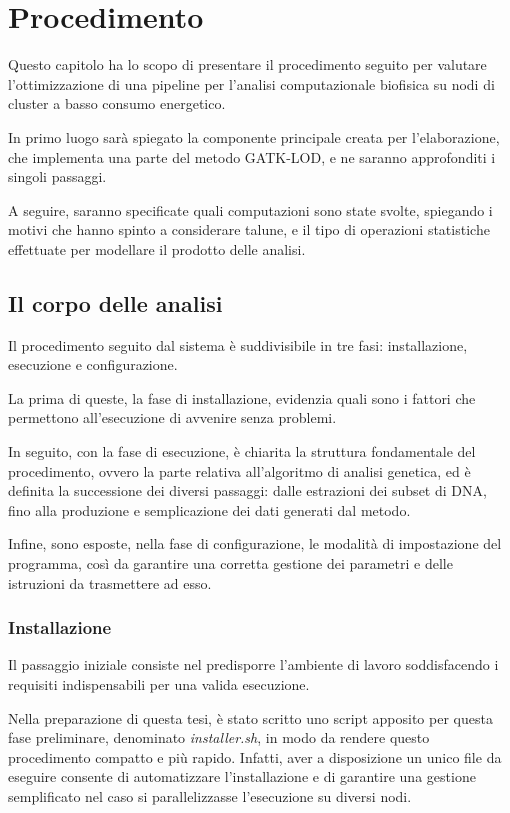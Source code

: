 \chapter{Procedimento}
Questo capitolo ha lo scopo di presentare il procedimento seguito per valutare l'ottimizzazione di una pipeline per l'analisi computazionale biofisica su nodi di cluster a basso consumo energetico.


In primo luogo sarà spiegato la componente principale creata per l'elaborazione, che implementa una parte del metodo GATK-LOD, e ne saranno approfonditi i singoli passaggi.

A seguire, saranno specificate quali computazioni sono state svolte, spiegando i motivi che hanno spinto a considerare talune, e il tipo di operazioni statistiche effettuate per modellare il prodotto delle analisi.



\section{Il corpo delle analisi}
Il procedimento seguito dal sistema è suddivisibile in tre fasi: installazione, esecuzione e configurazione.


La prima di queste, la fase di installazione, evidenzia quali sono i fattori che permettono all'esecuzione di avvenire senza problemi.


In seguito, con la fase di esecuzione, è chiarita la struttura fondamentale del procedimento, ovvero la parte relativa all'algoritmo di analisi genetica, ed è definita la successione dei diversi passaggi: dalle estrazioni dei subset di DNA, fino alla produzione e semplicazione dei dati generati dal metodo.


Infine, sono esposte, nella fase di configurazione, le modalità di impostazione del programma, così da garantire una corretta gestione dei parametri e delle istruzioni da trasmettere ad esso.


\subsection{Installazione}
Il passaggio iniziale consiste nel predisporre l'ambiente di lavoro soddisfacendo i requisiti indispensabili per una valida esecuzione.

Nella preparazione di questa tesi, è stato scritto uno script apposito per questa fase preliminare, denominato \textit{installer.sh}, in modo da rendere questo procedimento compatto e più rapido.
Infatti, aver a disposizione un unico file da eseguire consente di automatizzare l'installazione e di garantire una gestione semplificato nel caso si parallelizzasse l'esecuzione su diversi nodi.

